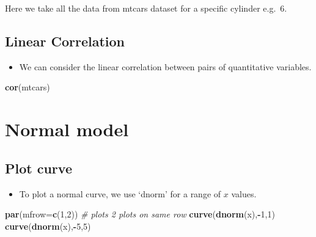 \documentclass[]{article}
\newenvironment{Shaded}{\begin{snugshade}}{\end{snugshade}}
\newcommand{\CommentTok}[1]{\textcolor[rgb]{0.56,0.35,0.01}{\textit{#1}}}
\newcommand{\DataTypeTok}[1]{\textcolor[rgb]{0.13,0.29,0.53}{#1}}
\newcommand{\DecValTok}[1]{\textcolor[rgb]{0.00,0.00,0.81}{#1}}
\newcommand{\KeywordTok}[1]{\textcolor[rgb]{0.13,0.29,0.53}{\textbf{#1}}}
\newcommand{\NormalTok}[1]{#1}
\newcommand{\OperatorTok}[1]{\textcolor[rgb]{0.81,0.36,0.00}{\textbf{#1}}}
\providecommand{\tightlist}{%
  \setlength{\itemsep}{0pt}\setlength{\parskip}{0pt}}
\begin{document}
Here we take all the data from mtcars dataset for a specific cylinder e.g.~6.

\begin{Shaded}
\end{Shaded}

\hypertarget{linear-correlation}{%
\subsection{Linear Correlation}\label{linear-correlation}}

\begin{itemize}
\tightlist
\item
  We can consider the linear correlation between pairs of quantitative variables.
\end{itemize}

\begin{Shaded}
\begin{Highlighting}[]
\KeywordTok{cor}\NormalTok{(mtcars)}
\end{Highlighting}
\end{Shaded}

\hypertarget{normalmodel}{%
\section{Normal model}\label{normalmodel}}

\hypertarget{plot-curve}{%
\subsection{Plot curve}\label{plot-curve}}

\begin{itemize}
\tightlist
\item
  To plot a normal curve, we use `dnorm' for a range of \(x\) values.
\end{itemize}

\begin{Shaded}
\begin{Highlighting}[]
\KeywordTok{par}\NormalTok{(}\DataTypeTok{mfrow=}\KeywordTok{c}\NormalTok{(}\DecValTok{1}\NormalTok{,}\DecValTok{2}\NormalTok{)) }\CommentTok{# plots 2 plots on same row}
\KeywordTok{curve}\NormalTok{(}\KeywordTok{dnorm}\NormalTok{(x),}\OperatorTok{-}\DecValTok{1}\NormalTok{,}\DecValTok{1}\NormalTok{)}
\KeywordTok{curve}\NormalTok{(}\KeywordTok{dnorm}\NormalTok{(x),}\OperatorTok{-}\DecValTok{5}\NormalTok{,}\DecValTok{5}\NormalTok{)}
\end{Highlighting}
\end{Shaded}
\end{document}
